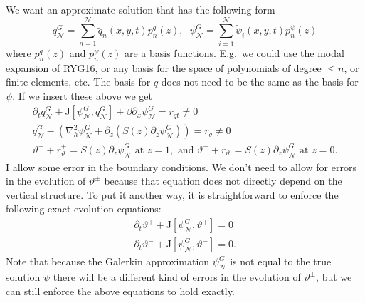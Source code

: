 \documentclass[10pt]{article}
\newcommand{\pd}[1]{\partial_{#1}}
\newcommand{\tJ}{\text{J}}
\newcommand{\sN}{\mathcal{N}}
\begin{document}
We want an approximate solution that has the following form
\begin{equation}
q_\sN^G = \sum_{n=1}^\sN \breve{q}_n(x,y,t)p_n^q(z),\;\;\psi_\sN^G = \sum_{i=1}^\sN \breve\psi_i(x,y,t)p_n^\psi(z)
\end{equation}
where $p_n^q(z)$ and $p_n^\psi(z)$ are a basis functions.
E.g.~we could use the modal expansion of RYG16, or any basis for the space of polynomials of degree $\le n$, or finite elements, etc.
The basis for $q$ does not need to be the same as the basis for $\psi$.
If we insert these above we get
\begin{gather}
\pd{t}q_\sN^G+\tJ[\psi_\sN^G,q_\sN^G]+\beta \pd{x}\psi_\sN^G= r_{qt}\neq0\\
q_\sN^G-\left(\nabla_h^2\psi_\sN^G + \pd{z}\left(S(z)\pd{z}\psi_\sN^G\right)\right)=r_q\neq0\\
\vartheta^++r_\vartheta^+= S(z)\pd{z}\psi_\sN^G\text{ at }z=1,\text{ and }\vartheta^-+r_\vartheta^- = S(z)\pd{z}\psi_\sN^G\text{ at }z=0.
\end{gather}
I allow some error in the boundary conditions.
We don't need to allow for errors in the evolution of $\vartheta^\pm$ because that equation does not directly depend on the vertical structure.
To put it another way, it is straightforward to enforce the following exact evolution equations:
\begin{gather}
\pd{t}\vartheta^+ + \tJ[\psi_\sN^G,\vartheta^+] =  0\\
\pd{t}\vartheta^-+ \tJ[\psi_\sN^G,\vartheta^-]= 0.
\end{gather}
Note that because the Galerkin approximation $\psi_\sN^G$ is not equal to the true solution $\psi$ there will be a different kind of errors in the evolution of $\vartheta^\pm$, but we can still enforce the above equations to hold exactly.
\end{document}
